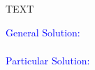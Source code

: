 \item TEXT

\textcolor{blue}{
    \begin{minipage}[t]{0.45\textwidth}
        General Solution:
        \begin{gather*}
        \end{gather*}
    \end{minipage}
    \hfill
    \begin{minipage}[t]{0.45\textwidth}
        Particular Solution:
        \begin{gather*}
        \end{gather*}
    \end{minipage}
}